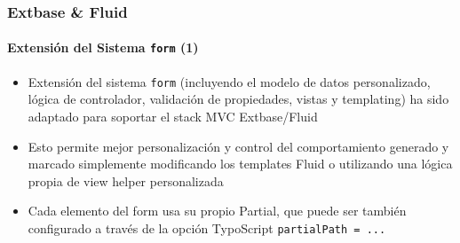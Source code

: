 \begin{frame}[fragile]
	\frametitle{Extbase \& Fluid}
	\framesubtitle{Extensión del Sistema \texttt{form} (1)}

	\begin{itemize}

		\item Extensión del sistema \texttt{form} (incluyendo el modelo de datos personalizado, lógica de
			controlador, validación de propiedades, vistas y templating) ha sido adaptado para soportar
			el stack MVC Extbase/Fluid

		\item Esto permite mejor personalización y control del comportamiento generado y
			marcado simplemente modificando los templates Fluid o utilizando una lógica propia de view helper personalizada

		\item Cada elemento del form usa su propio Partial, que puede ser también configurado a través de
			la opción TypoScript \texttt{partialPath = ...}

	\end{itemize}

\end{frame}


